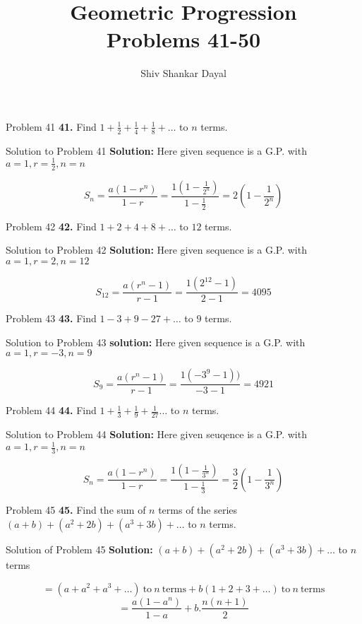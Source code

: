 \documentclass[aspectratio=1610,8pt]{beamer}
\title{Geometric Progression\\Problems 41-50}
\author[Shiv Shankar Dayal]{Shiv Shankar Dayal}
\begin{document}
\begin{frame}
       \titlepage
\end{frame}
\begin{frame}{Problem 41}
  \textbf{41.} Find $1 + \frac{1}{2} + \frac{1}{4} + \frac{1}{8} + \ldots$ to $n$ terms.
\end{frame}
\begin{frame}{Solution to Problem 41}
  \textbf{Solution:} Here given sequence is a G.P. with $a = 1, r = \frac{1}{2}, n = n$

  $$S_n = \frac{a(1- r^n)}{1 - r} = \frac{1\left(1 - \frac{1}{2^n}\right)}{1 - \frac{1}{2}} = 2\left(1 - \frac{1}{2^n}\right)$$
\end{frame}
\begin{frame}{Problem 42}
    \textbf{42.} Find $1 + 2 + 4 + 8 + \ldots$ to $12$ terms.
\end{frame}
\begin{frame}{Solution to Problem 42}
  \textbf{Solution:} Here given sequence is a G.P. with $a = 1, r = 2, n = 12$

  $$S_{12} = \frac{a(r^n - 1)}{r - 1} = \frac{1(2^{12} - 1)}{2 - 1} = 4095$$
\end{frame}
\begin{frame}{Problem 43}
  \textbf{43.} Find $1 - 3 + 9 - 27 + \ldots$ to $9$ terms.
\end{frame}
\begin{frame}{Solution to Problem 43}
  \textbf{solution:} Here given sequence is a G.P. with $a = 1, r= -3, n = 9$

  $$S_9 = \frac{a(r^n - 1)}{r - 1} = \frac{1(-3^9 - 1))}{-3 - 1} = 4921$$
\end{frame}
\begin{frame}{Problem 44}
    \textbf{44.} Find $1 + \frac{1}{3} + \frac{1}{9} + \frac{1}{27} \ldots$ to $n$ terms.
\end{frame}
\begin{frame}{Solution to Problem 44}
  \textbf{Solution:} Here given seuqence is a G.P. with $a = 1, r = \frac{1}{3}, n =  n$

  $$S_n = \frac{a(1 - r^n)}{1 - r} = \frac{1\left(1 - \frac{1}{3^n}\right)}{1 - \frac{1}{3}} = \frac{3}{2}\left(1 - \frac{1}{3^n}\right)$$
\end{frame}
\begin{frame}{Problem 45}
  \textbf{45.} Find the sum of $n$ terms of the series $(a + b) + (a^2 + 2b) + (a^3 + 3b) + \ldots$ to $n$ terms.
\end{frame}
\begin{frame}{Solution of Problem 45}
  \textbf{Solution:} $(a + b) + (a^2 + 2b) + (a^3 + 3b) + \ldots$ to $n$ terms

  $$=(a + a^2 + a^3 + \ldots)~\text{to}~n~\text{terms} + b(1 + 2 + 3 + \ldots)~\text{to}~n~\text{terms}$$
  $$= \frac{a(1 - a^n)}{1 - a} + b.\frac{n(n + 1)}{2}$$
\end{frame}
\end{document}
